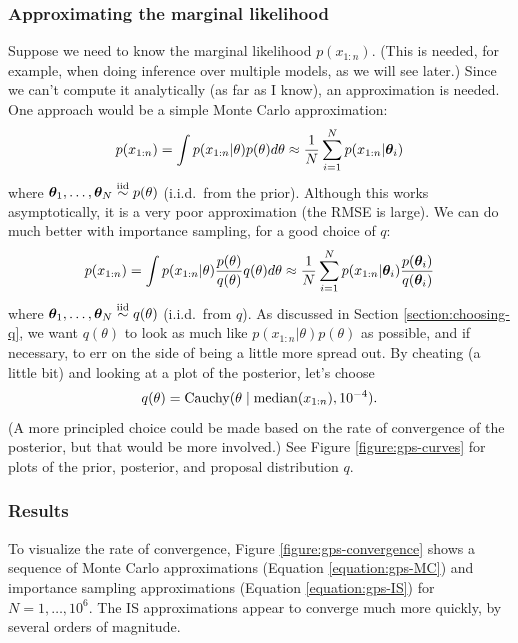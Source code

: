 \documentclass[12pt]{article}
\begin{document}
\subsubsection*{Approximating the marginal likelihood}
Suppose we need to know the marginal likelihood $p(x_{1:n})$. (This is needed, for example, when doing inference over multiple models, as we will see later.) Since we can't compute it analytically (as far as I know), an approximation is needed. One approach would be a simple Monte Carlo approximation:
\begin{align}\label{equation:gps-MC}
p(x_{1:n}) =\int p(x_{1:n}|\theta) p(\theta) d\theta
\approx\frac{1}{N}\sum_{i = 1}^N p(x_{1:n}|{\bm\theta}_i)
\end{align}
where ${\bm\theta}_1,\dotsc,{\bm\theta}_N\stackrel{\mathrm{iid}}{\sim} p(\theta)$ (i.i.d.\ from the prior). Although this works asymptotically, it is a very poor approximation (the RMSE is large). We can do much better with importance sampling, for a good choice of $q$:
\begin{align}\label{equation:gps-IS}
p(x_{1:n}) = \int p(x_{1:n}|\theta) \frac{p(\theta)}{q(\theta)}q(\theta) d\theta 
 \approx\frac{1}{N}\sum_{i = 1}^N p(x_{1:n}|{\bm\theta}_i) \frac{p({\bm\theta}_i)}{q({\bm\theta}_i)}
\end{align}
where ${\bm\theta}_1,\dotsc,{\bm\theta}_N\stackrel{\mathrm{iid}}{\sim} q(\theta)$ (i.i.d.\ from $q$). As discussed in Section \ref{section:choosing-q}, we want $q(\theta)$ to look as
much like $p(x_{1:n}|\theta) p(\theta)$ as possible, and if necessary, to err on the side of being a little more spread out. By cheating (a little bit) and looking at a plot of the posterior, let's choose
$$q(\theta) = \operatorname*{Cauchy}(\theta\mid \operatorname*{median}(x_{1:n}), 10^{-4}).$$
(A more principled choice could be made based on the rate of convergence of the posterior, but that would be more involved.)  See Figure \ref{figure:gps-curves} for plots of the prior, posterior, and proposal distribution $q$.

\subsubsection*{Results}
To visualize the rate of convergence, Figure \ref{figure:gps-convergence} shows a sequence of Monte Carlo approximations (Equation \ref{equation:gps-MC}) and importance sampling approximations (Equation \ref{equation:gps-IS}) for $N=1,\ldots,10^6$.
The IS approximations appear to converge much more quickly, by several orders of magnitude.
\end{document}
